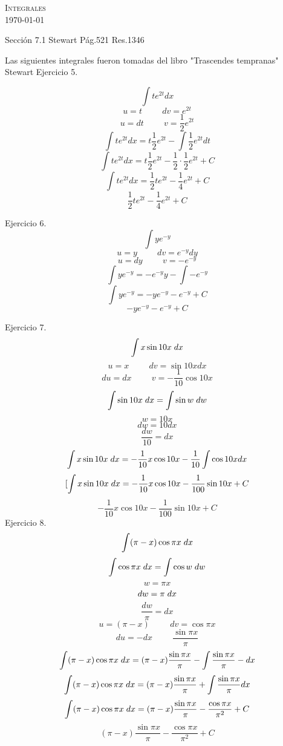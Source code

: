 \documentclass{amsart}
\begin{document}
    \begin{center}
        \textsc{ Integrales} \\
        \today
    \end{center}
    \begin{flushleft}
        Sección 7.1 Stewart Pág.521 Res.1346
    \end{flushleft}
    Las siguientes integrales fueron tomadas del libro "Trascendes tempranas" Stewart
    Ejercicio 5.
    
    \[\int te^{2t} dx\]
    \[ u = t \hspace{1cm} dv=e^{2t}\]
    \[ u = dt \hspace{1cm} v = \frac{1}{2}e^{2t}\]
    \[\int te^{2t} dx = t\frac{1}{2}e^{2t} - \int \frac{1}{2}e^{2t} dt\]
    \[\int te^{2t} dx = t\frac{1}{2}e^{2t} - \frac{1}{2}\cdot\frac{1}{2}e^{2t} + C\]
    \[\int te^{2t} dx = \frac{1}{2}te^{2t} - \frac{1}{4}e^{2t} + C\]
    \[\frac{1}{2}te^{2t} - \frac{1}{4}e^{2t} + C\]
    
    Ejercicio 6.
    \[\int ye^{-y}\]
    \[u = y \hspace{1cm} dv = e^{-y} dy\]
    \[u = dy \hspace{1cm} v = -e^{-y}\]
    \[\int ye^{-y} = -e^{-y}y - \int -e^{-y}\]
    \[\int ye^{-y} = -ye^{-y} -e^{-y} + C\]
    \[-ye^{-y} -e^{-y} + C\]
    
    Ejercicio 7.
    \[\int x\sin{10x} \hspace{1mm} dx\]
    \[ u = x \hspace{1cm} dv = \sin{10x} dx\]
    \[ du = dx \hspace{1cm} v = -\frac{1}{10}\cos{10x}\]
    \[\int \sin{10x} \hspace{1mm} dx = \int \sin{w} \hspace{1mm} dw\]
    \[w = 10x\]
    \[dw = 10 dx\]
    \[\frac{dw}{10} = dx\]
    \[\int x\sin{10x} \hspace{1mm} dx = -\frac{1}{10}x\cos{10x} - \frac{1}{10}\int \cos{10x} dx\]
    \[[\int x\sin{10x} \hspace{1mm} dx = -\frac{1}{10}x\cos{10x} - \frac{1}{100}\sin{10x} + C\]
    \[-\frac{1}{10}x\cos{10x} - \frac{1}{100}\sin{10x} + C\]
    Ejercicio 8.
    \[\int(\pi - x)\cos{\pi x} \hspace{1mm} dx\]
    \[\int \cos{\pi x} \hspace{1mm} dx = \int \cos{w} \hspace{1mm} dw\]
    \[ w = \pi x \]
    \[ dw = \pi \hspace{1mm} dx\]
    \[\frac{dw}{\pi} = dx\]
    \[ u = (\pi -x) \hspace{1cm} dv = \cos{\pi x}\]
    \[ du = -dx \hspace{1cm} \frac{\sin{\pi x}}{\pi}\]
    \[\int(\pi - x)\cos{\pi x} \hspace{1mm} dx = (\pi - x)\frac{\sin{\pi x}}{\pi} - \int \frac{\sin{\pi x}}{\pi} -dx\]
    \[\int(\pi - x)\cos{\pi x} \hspace{1mm} dx = (\pi - x)\frac{\sin{\pi x}}{\pi} + \int \frac{\sin{\pi x}}{\pi} dx\]
    \[\int(\pi - x)\cos{\pi x} \hspace{1mm} dx = (\pi - x)\frac{\sin{\pi x}}{\pi} - \frac{\cos{\pi x}}{\pi^{2}} + C\]
    \[(\pi - x)\frac{\sin{\pi x}}{\pi} - \frac{\cos{\pi x}}{\pi^{2}} + C\]
\end{document}
